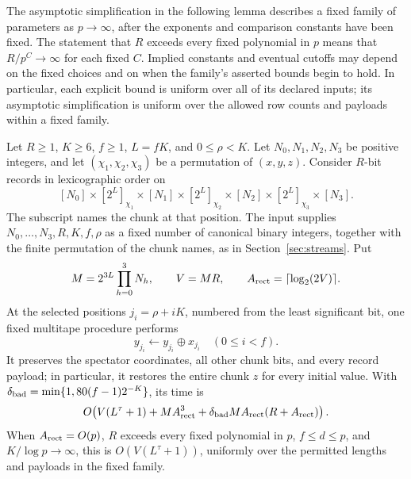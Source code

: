 The asymptotic simplification in the following lemma describes a fixed
family of parameters as \(p\to\infty\), after the exponents and comparison
constants have been fixed.  The statement that \(R\) exceeds every fixed
polynomial in \(p\) means that \(R/p^C\to\infty\) for each fixed \(C\).
Implied constants and eventual cutoffs may depend on the fixed choices
and on when the family's asserted bounds begin to hold.  In particular,
each explicit bound is uniform over all of its declared inputs;
its asymptotic simplification is uniform over the allowed row counts
and payloads within a fixed family.

\begin{lemma}
\label{lem:packed-selected-bit-rectangle}
Let $R\ge1$, $K\ge6$, $f\ge1$, $L=fK$, and $0\le\rho<K$.
Let $N_0,N_1,N_2,N_3$ be positive integers, and let
$(\chi_1,\chi_2,\chi_3)$ be a permutation of $(x,y,z)$.
Consider $R$-bit records in lexicographic order on
\[
 [N_0]\times[2^L]_{\chi_1}\times[N_1]\times[2^L]_{\chi_2}
 \times[N_2]\times[2^L]_{\chi_3}\times[N_3].
\]
The subscript names the chunk at that position. The input supplies
$N_0,\ldots,N_3,R,K,f,\rho$ as a fixed number of canonical binary
integers, together with the finite permutation of the chunk names, as
in Section~\ref{sec:streams}. Put
\[
 M=2^{3L}\prod_{h=0}^3N_h,\qquad V=MR,\qquad
 A_{\rm rect}=\lceil\log_2(2V)\rceil.
\]
At the selected positions $j_i=\rho+iK$, numbered from the least
significant bit, one fixed multitape procedure performs
\[
 y_{j_i}\longleftarrow y_{j_i}\mathbin\oplus x_{j_i}
 \quad(0\le i<f).
\]
It preserves the spectator coordinates, all other chunk bits, and every
record payload; in particular, it restores the entire chunk $z$ for
every initial value.
With $\delta_{\rm bad}=\min\{1,80(f-1)2^{-K}\}$, its time is
\begin{equation}
\label{eq:packed-rectangle-time}
 O\!\left(V(L^\tau+1)+MA_{\rm rect}^3+
       \delta_{\rm bad}MA_{\rm rect}(R+A_{\rm rect})\right).
\end{equation}
When $A_{\rm rect}=O(p)$, $R$ exceeds every fixed polynomial in $p$,
$f\le d\le p$, and $K/\log p\to\infty$, this is
$O(V(L^\tau+1))$, uniformly over the permitted lengths and payloads
in the fixed family.
\end{lemma}

